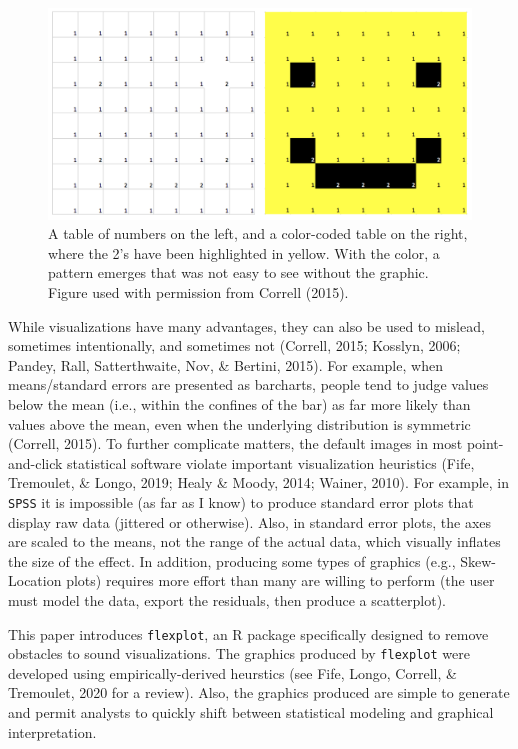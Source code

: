 \documentclass[
  english,
  man]{apa6}
\begin{document}
\begin{figure}
\centering
\includegraphics{images/screenshots/smiley.png}
\caption{A table of numbers on the left, and a color-coded table on the right, where the 2's have been highlighted in yellow. With the color, a pattern emerges that was not easy to see without the graphic. Figure used with permission from Correll (2015).}
\label{fig:smiley}
\end{figure}

While visualizations have many advantages, they can also be used to mislead, sometimes intentionally, and sometimes not (Correll, 2015; Kosslyn, 2006; Pandey, Rall, Satterthwaite, Nov, \& Bertini, 2015). For example, when means/standard errors are presented as barcharts, people tend to judge values below the mean (i.e., within the confines of the bar) as far more likely than values above the mean, even when the underlying distribution is symmetric (Correll, 2015). To further complicate matters, the default images in most point-and-click statistical software violate important visualization heuristics (Fife, Tremoulet, \& Longo, 2019; Healy \& Moody, 2014; Wainer, 2010). For example, in \texttt{SPSS} it is impossible (as far as I know) to produce standard error plots that display raw data (jittered or otherwise). Also, in standard error plots, the axes are scaled to the means, not the range of the actual data, which visually inflates the size of the effect. In addition, producing some types of graphics (e.g., Skew-Location plots) requires more effort than many are willing to perform (the user must model the data, export the residuals, then produce a scatterplot).

This paper introduces \texttt{flexplot}, an R package specifically designed to remove obstacles to sound visualizations. The graphics produced by \texttt{flexplot} were developed using empirically-derived heurstics (see Fife, Longo, Correll, \& Tremoulet, 2020 for a review). Also, the graphics produced are simple to generate and permit analysts to quickly shift between statistical modeling and graphical interpretation.
\end{document}
